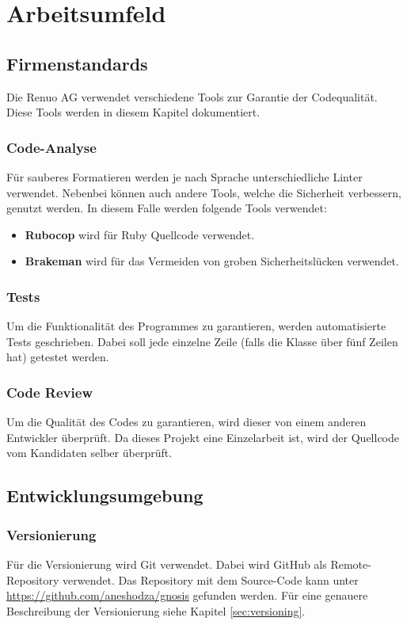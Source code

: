 \chapter{Arbeitsumfeld}

\section{Firmenstandards}
Die Renuo AG verwendet verschiedene Tools zur Garantie der Codequalität. Diese Tools werden in diesem Kapitel dokumentiert.
\subsection{Code-Analyse}
Für sauberes Formatieren werden je nach Sprache unterschiedliche \gls{Linter} verwendet. Nebenbei können auch andere Tools, welche die Sicherheit verbessern, genutzt werden. In diesem Falle werden folgende Tools verwendet:
\begin{itemize}
    \item \textbf{Rubocop} wird für Ruby Quellcode verwendet.
    \item \textbf{Brakeman} wird für das Vermeiden von groben Sicherheitslücken verwendet.
\end{itemize}
\subsection{Tests}
Um die Funktionalität des Programmes zu garantieren, werden automatisierte Tests geschrieben. Dabei soll jede einzelne Zeile (falls die Klasse über fünf Zeilen hat) getestet werden.
\subsection{Code Review}
Um die Qualität des Codes zu garantieren, wird dieser von einem anderen Entwickler überprüft. Da dieses Projekt eine Einzelarbeit ist, wird der Quellcode vom Kandidaten selber überprüft.

\newpage
\section{Entwicklungsumgebung}
\subsection{Versionierung}
Für die Versionierung wird Git verwendet. Dabei wird GitHub als Remote-Repository verwendet. Das Repository mit
dem Source-Code kann unter \url{https://github.com/aneshodza/gnosis} gefunden werden. Für eine genauere Beschreibung
der Versionierung siehe Kapitel \ref{sec:versioning}.
